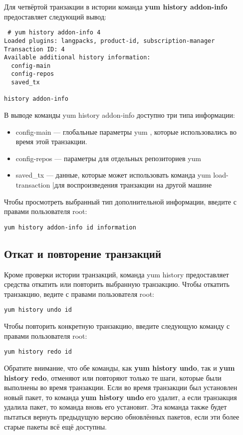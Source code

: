 \documentclass[a4paper,10pt,twoside]{article}
\begin{document}
Для четвёртой транзакции в истории команда \textbf{yum history addon-info} предоставляет следующий вывод:
\begin{verbatim}
 # yum history addon-info 4
Loaded plugins: langpacks, product-id, subscription-manager
Transaction ID: 4
Available additional history information:
  config-main
  config-repos
  saved_tx

history addon-info
\end{verbatim} 


В выводе команды yum history addon-info доступно три типа информации:

\begin{itemize}
\item config-main — глобальные параметры yum , которые использовались во время этой транзакции.
\item config-repos — параметры для  отдельных репозиториев yum
\item saved\_tx — данные, которые может использовать команда yum load-transaction |для воспроизведения транзакции на другой машине
\end{itemize}

Чтобы просмотреть выбранный тип дополнительной информации, введите с правами пользователя root: 
\begin{verbatim}
yum history addon-info id information
\end{verbatim} 

\subsection{Откат и повторение транзакций}
Кроме проверки истории транзакций, команда yum history предоставляет средства откатить или повторить выбранную транзакцию. Чтобы откатить транзакцию, ведите с правами пользователя root: 
\begin{verbatim}
yum history undo id
\end{verbatim} 

Чтобы повторить конкретную транзакцию, введите следующую команду с правами пользователя root: 
\begin{verbatim}
yum history redo id
\end{verbatim} 


Обратите внимание, что обе команды, как \textbf{yum history undo}, так и \textbf{yum history redo}, отменяют или повторяют только те шаги, которые были выполнены во время транзакции. Если во время транзакции был установлен новый пакет, то команда \textbf{yum history undo} его удалит, а если транзакция удалила пакет, то команда вновь его установит. Эта команда также будет пытаться вернуть предыдущую версию обновлённых пакетов, если эти более старые пакеты всё ещё доступны.
\end{document}
